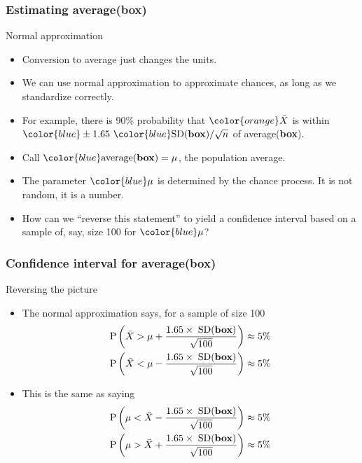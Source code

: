 \documentclass[handout]{beamer}
\begin{document}
   \begin{frame} \frametitle{Estimating {\color{blue} average({\bf box})}}

   \begin{block}
   {Normal approximation}
   \begin{itemize}
   \item Conversion to average just changes the units.
   \item We can use normal approximation to approximate chances,
   as long as we standardize correctly.

   \item For example, there is 90\% probability that
   $\color{orange}\bar{X}$ is within ${ \color{blue} \pm 1.65 \ \color{blue}\text{SD({\bf box})} / \sqrt{n}}$ of {\color{blue} average({\bf box})}.

   \item Call  ${\color{blue} \text{average}({\bf box})= \mu}$, the {\color{blue} population average}.
   \item The parameter ${\color{blue} \mu}$ is determined by the chance process. It is not random, it is a number.
   \item How can we ``reverse this statement'' to yield a confidence interval
   based on a sample of, say, size 100 for ${\color{blue} \mu}$?

   \end{itemize}
   \end{block}
   \end{frame}


   \begin{frame} \frametitle{Confidence interval for {\color{blue} average({\bf box})}}

   \begin{block}
   {Reversing the picture}
   \begin{itemize}
   \item The normal approximation says, for a sample of size 100
   $$
   \begin{aligned}
   \text{P} \left(\text{$\bar{X} > \mu + \frac{1.65 \times \; \text{SD({\bf box})}}{\sqrt{100}}$}\right) &\approx 5\% \\
   \text{P} \left(\text{$\bar{X} < \mu - \frac{1.65 \times \; \text{SD({\bf box})}}{\sqrt{100}}$}\right) &\approx 5\% \\
   \end{aligned}
   $$
   \item This is the same as saying
   $$
   \begin{aligned}
   \text{P} \left(\text{$\mu < \bar{X} - \frac{1.65 \times \; \text{SD({\bf box})}}{\sqrt{100}}$}\right) &\approx 5\% \\
   \text{P} \left(\text{$ \mu > \bar{X} + \frac{1.65 \times \; \text{SD({\bf box})}}{\sqrt{100}}$}\right) &\approx 5\% \\
   \end{aligned}
   $$
   \end{itemize}
   \end{block}
   \end{frame}
\end{document}
